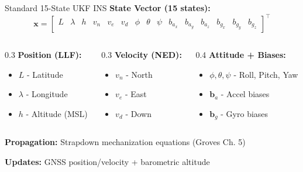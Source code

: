\documentclass[aspectratio=169]{beamer}
\begin{document}
\begin{frame}{Standard 15-State UKF INS}
\textbf{State Vector (15 states):}
\begin{equation*}
\mathbf{x} = \left[\begin{array}{ccccccccccccccc}
  L & \lambda & h & v_n & v_e & v_d & \phi & \theta & \psi & b_{a_x} & b_{a_y} & b_{a_z} & b_{g_x} & b_{g_y} & b_{g_z}
\end{array}\right]^\intercal
\end{equation*}

\vspace{0.5em}

\begin{columns}[t]
\begin{column}{0.3\textwidth}
\textbf{Position (LLF):}
\begin{itemize}
    \item $L$ - Latitude
    \item $\lambda$ - Longitude
    \item $h$ - Altitude (MSL)
\end{itemize}
\end{column}

\begin{column}{0.3\textwidth}
\textbf{Velocity (NED):}
\begin{itemize}
    \item $v_n$ - North
    \item $v_e$ - East
    \item $v_d$ - Down
\end{itemize}
\end{column}

\begin{column}{0.4\textwidth}
\textbf{Attitude + Biases:}
\begin{itemize}
    \item $\phi, \theta, \psi$ - Roll, Pitch, Yaw
    \item $\mathbf{b}_a$ - Accel biases
    \item $\mathbf{b}_g$ - Gyro biases
\end{itemize}
\end{column}
\end{columns}

\vspace{1em}

\textbf{Propagation:} Strapdown mechanization equations (Groves Ch. 5)

\textbf{Updates:} GNSS position/velocity + barometric altitude
\end{frame}
\end{document}

